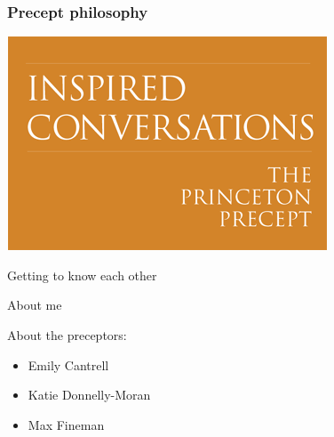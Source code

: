 \documentclass[aspectratio=169]{beamer}
\begin{document}
\begin{frame}
\frametitle{Precept philosophy}

\begin{center}
\includegraphics[height=0.80\textheight]{figures/princeton_precept}
\end{center}

\vfill
{}


\end{frame}
\begin{frame}

\begin{center}
\Large{Getting to know each other}
\end{center}

\end{frame}
\begin{frame}

\begin{center}
\Large{About me}
\end{center}

\end{frame}
\begin{frame}

About the preceptors:
\begin{itemize}
\item Emily Cantrell
\item Katie Donnelly-Moran
\item Max Fineman
\end{itemize}

\end{frame}
\end{document}
